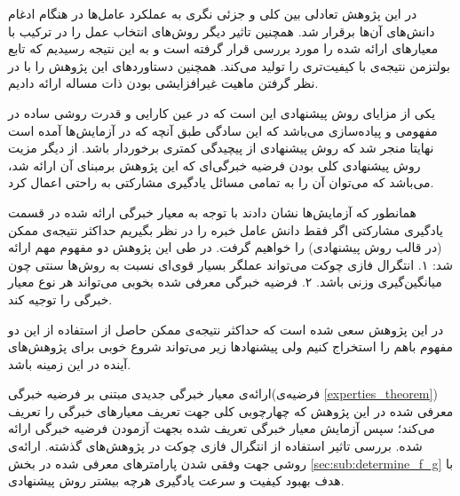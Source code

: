 در این پژوهش تعادلی بین کلی و جزئی نگری به عملکرد عامل‌ها در هنگام ادغام دانش‌های آن‌ها برقرار شد. همچنین تاثیر دیگر روش‌های انتخاب عمل را در ترکیب با معیار‌های ارائه شده را مورد بررسی قرار گرفته است و به این نتیجه رسیدیم که تابع بولتزمن نتیجه‌ی با کیفیت‌تری را تولید می‌کند. همچنین دستاورد‌های این پژوهش را با در نظر گرفتن ماهیت غیرافزایشی بودن ذات مساله ارائه دادیم.

یکی از مزایای روش پیشنهادی این است که در عین کارایی و قدرت روشی ساده در مفهومی و پیاده‌سازی می‌باشد که این سادگی طبق آنچه که در آزمایش‌ها آمده است نهایتا منجر شد که روش پیشنهادی از پیچیدگی کمتری برخوردار باشد. از دیگر مزیت روش پیشنهادی کلی بودن فرضیه خبرگی‌ای که این پژوهش برمبنای آن ارائه شد، می‌باشد که می‌توان آن را به تمامی مسائل یادگیری مشارکتی به راحتی اعمال کرد.

همانطور که آزمایش‌ها نشان دادند با توجه به معیار خبرگی ارائه شده در قسمت یادگیری مشارکتی اگر فقط دانش عامل خبره را در نظر بگیریم حداکثر نتیجه‌ی ممکن (در قالب روش پیشنهادی) را خواهیم گرفت. در طی این پژوهش دو مفهوم مهم ارائه شد: ۱. انتگرال فازی چوکت می‌تواند عملگر بسیار قوی‌ای نسبت به روش‌ها سنتی چون میانگین‌گیری وزنی باشد. ۲. فرضیه خبرگی معرفی شده بخوبی می‌تواند هر نوع معیار خبرگی را توجیه کند.

در این پژوهش سعی شده است که حداکثر نتیجه‌ی ممکن حاصل از استفاده از این دو مفهوم باهم را استخراج کنیم ولی پیشنهادها زیر می‌تواند شروع خوبی برای پژوهش‌های آینده در این زمینه باشد.

\begin{enumerate}
 ارائه‌ی معیار خبرگی جدیدی مبتنی بر فرضیه خبرگی(فرضیه‌ی \ref{experties_theorem}) معرفی شده در این پژوهش که چهارچوبی کلی جهت تعریف معیارهای خبرگی را تعریف می‌کند؛ سپس آزمایش معیار خبرگی تعریف شده بجهت آزمودن فرضیه خبرگی ارائه شده.
 بررسی تاثیر استفاده از انتگرال فازی چوکت در پژوهش‌های گذشته.
 ارائه‌ی روشی جهت وفقی شدن پارامترهای معرفی شده در بخش \ref{sec:sub:determine_f_g} با هدف بهبود کیفیت و سرعت یادگیری هرچه بیشتر روش پیشنهادی.
\end{enumerate}